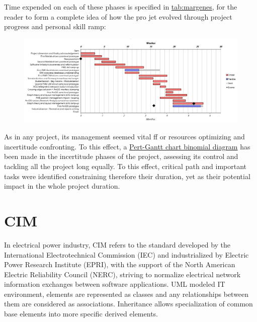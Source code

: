 Time expended on each of these phases is specified in \href{the table hereafter}{tab:margenes}, for the reader to form a complete idea of how the pro jet evolved through project progress and personal skill ramp:

\begin{figure}[h]
    \centering
    \parbox[t]{1\textwidth}{
    \href{}{\includegraphics[width=1\textwidth]{0.figuras/Gantt-proejct.png}}
    \label{fig:Gantt-diagram}}
\end{figure}

As in any project, its management seemed vital ff or resources optimizing and incertitude confronting. To this effect, a \hyperref[fig:Gantt-diagram]{Pert-Gantt chart binomial diagram} has been made in the incertitude phases of the project, assessing its control and tackling all the project long equally. To this effect, critical path and important tasks were identified constraining therefore their duration, yet as their potential impact in the whole project duration.


\section{CIM}
\label{sec:approach:cim}

In electrical power industry, CIM refers to the standard developed by the International Electrotechnical Commission (IEC) and industrialized by Electric Power Research Institute (EPRI), with the support of the North American Electric Reliability Council (NERC), striving to normalize electrical network information exchanges between software applications\cite{IEC_CIM_static}. UML modeled IT environment, elements are represented as classes and any relationships between them are considered as associations. Inheritance allows specialization of common base elements into more specific derived elements.


